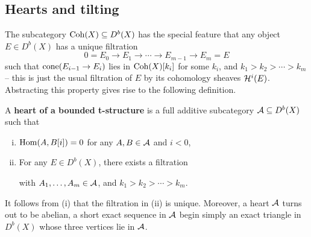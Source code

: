 \subsection{Hearts and tilting}
The subcategory $\operatorname{\mathrm{Coh}}(X) \subseteq D^b(X)$ has the special feature that any object $E \in D^b(X)$ has a unique filtration
\[ 0 = E_0 \to E_1 \to \cdots \to E_{m-1} \to E_m = E \]
such that $\operatorname{\mathrm{cone}}(E_{i-1} \to E_i)$ lies in $\operatorname{\mathrm{Coh}}(X)[k_i]$ for some $k_i$, and $k_1 > k_2 > \cdots > k_m$ -- this is just the usual filtration of $E$ by its cohomology sheaves $\mathcal{H}^i(E)$. Abstracting this property gives rise to the following definition.
\begin{defn}
    A {\bf heart of a bounded t-structure} is a full additive subcategory $\mathcal{A} \subseteq D^b(X)$ such that
    \begin{enumerate}[(i)]
        \item $\mathrm{Hom}(A, B[i]) = 0$ for any $A, B \in \mathcal{A}$ and $i < 0$,
        \item For any $E \in D^b(X)$, there exists a filtration
        \begin{center}
        \end{center}
        with $A_1, \ldots, A_m \in \mathcal{A}$, and $k_1 > k_2 > \cdots > k_m$.
    \end{enumerate}
\end{defn}
It follows from (i) that the filtration in (ii) is unique. Moreover, a heart $\mathcal{A}$ turns out to be abelian, a short exact sequence in $\mathcal{A}$ begin simply an exact triangle in $D^b(X)$ whose three vertices lie in $\mathcal{A}$.

